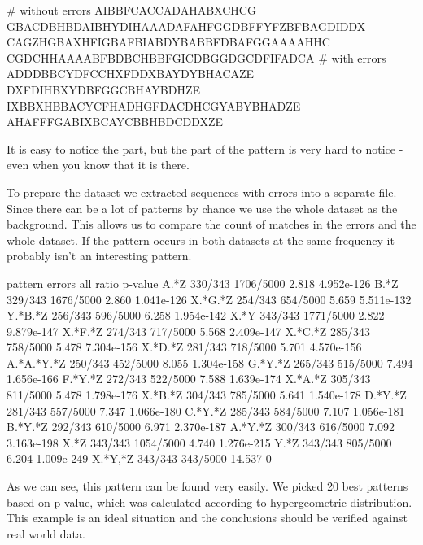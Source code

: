 \begin{file}
# without errors
AIBBFCACCADAHABXCHCG
GBACDBHBDAIBHYDIHAAADAFAHFGGDBFFYFZBFBAGDIDDX
CAGZHGBAXHFIGBAFBIABDYBABBFDBAFGGAAAAHHC
CGDCHHAAAABFBDBCHBBFGICDBGGDGCDFIFADCA
# with errors
ADDDBBCYDFCCHXFDDXBAYDYBHACAZE
DXFDIHBXYDBFGGCBHAYBDHZE
IXBBXHBBACYCFHADHGFDACDHCGYABYBHADZE
AHAFFFGABIXBCAYCBBHBDCDDXZE
\end{file}

It is easy to notice the  part, but the  part of the pattern is very hard to notice - even when you know that it is there. 

To prepare the dataset we extracted sequences with errors into a separate file. Since there can be a lot of patterns by chance we use the whole dataset as the background. This allows us to compare the count of matches in the errors and the whole dataset. If the pattern occurs in both datasets at the same frequency it probably isn't an interesting pattern.

\begin{file}
pattern      errors      all            ratio      p-value
A.*Z         330/343     1706/5000      2.818      4.952e-126
B.*Z         329/343     1676/5000      2.860      1.041e-126
X.*G.*Z      254/343     654/5000       5.659      5.511e-132
Y.*B.*Z      256/343     596/5000       6.258      1.954e-142
X.*Y         343/343     1771/5000      2.822      9.879e-147
X.*F.*Z      274/343     717/5000       5.568      2.409e-147
X.*C.*Z      285/343     758/5000       5.478      7.304e-156
X.*D.*Z      281/343     718/5000       5.701      4.570e-156
A.*A.*Y.*Z   250/343     452/5000       8.055      1.304e-158
G.*Y.*Z      265/343     515/5000       7.494      1.656e-166
F.*Y.*Z      272/343     522/5000       7.588      1.639e-174
X.*A.*Z      305/343     811/5000       5.478      1.798e-176
X.*B.*Z      304/343     785/5000       5.641      1.540e-178
D.*Y.*Z      281/343     557/5000       7.347      1.066e-180
C.*Y.*Z      285/343     584/5000       7.107      1.056e-181
B.*Y.*Z      292/343     610/5000       6.971      2.370e-187
A.*Y.*Z      300/343     616/5000       7.092      3.163e-198
X.*Z         343/343     1054/5000      4.740      1.276e-215
Y.*Z         343/343     805/5000       6.204      1.009e-249
X.*Y,*Z      343/343     343/5000       14.537     0
\end{file}

As we can see, this  pattern can be found very easily. We picked 20 best patterns based on p-value, which was calculated according to hypergeometric distribution. This example is an ideal situation and the conclusions should be verified against real world data.

